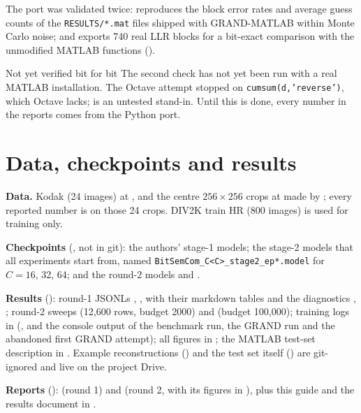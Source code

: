 \documentclass{article}
\begin{document}
The port was validated twice:  reproduces the block error rates and
average guess counts of the \texttt{RESULTS/*.mat} files shipped with GRAND-MATLAB within Monte Carlo
noise; and  exports 740 real LLR blocks for a bit-exact comparison
with the unmodified MATLAB functions ().

\begin{warningbox}{Not yet verified bit for bit}
The second check has not yet been run with a real MATLAB installation. The Octave attempt stopped on
\texttt{cumsum(d,'reverse')}, which Octave lacks;  is an untested
stand-in. Until this is done, every number in the reports comes from the Python port.
\end{warningbox}

\section{Data, checkpoints and results}
\label{sec:results}

\textbf{Data.} Kodak (24 images) at , and the centre $256\times256$ crops at
 made by ; every reported
number is on those 24 crops. DIV2K train HR (800 images) is used for training only.

\textbf{Checkpoints} (, not in git): the authors' stage-1 models; the stage-2 models
that all experiments start from, named \texttt{BitSemCom\_C<C>\_stage2\_ep*.model} for $C=16$, 32, 64;
and the round-2 models  and .

\textbf{Results} (): round-1 JSONLs , ,  with their
markdown tables  and the diagnostics ,
; round-2 sweeps  (12{,}600 rows, budget 2000) and
 (budget 100{,}000); training logs in  (,
 and the console output of the benchmark run, the GRAND run and the abandoned first GRAND
attempt); all figures in ; the MATLAB test-set description in .
Example reconstructions () and the test set itself () are
git-ignored and live on the project Drive.

\textbf{Reports} ():  (round 1) and  (round 2,
with its figures in ), plus this guide and the results document in
.
\end{document}
